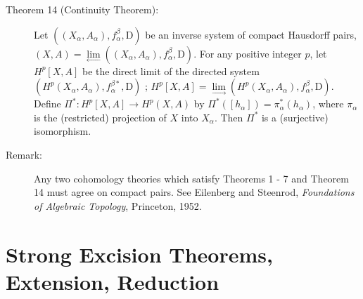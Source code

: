 \documentclass{article}
\def\plim{\lim\limits_{\leftarrow}^{}}
\def\dlim{\lim\limits_{ \rightarrow}^{}}
\begin{document}
\begin{description}
\item[Theorem 14 (Continuity Theorem):] Let $((X_{\alpha}, A_{\alpha}), f_{\alpha}^{\beta}, \text{D})$ be an inverse system of compact Hausdorff pairs, $(X,A) = \plim ((X_{\alpha}, A_{\alpha}), f_{\alpha}^{\beta}, \text{D})$. For any positive integer $p$, let $H^p[X,A]$ be the direct limit of the directed system $(H^p(X_{\alpha}, A_{\alpha}), f_{\alpha}^{\beta*}, \text{D})$ ; $H^p[X,A] = \dlim (H^p(X_{\alpha},A_{\alpha}), f_{\alpha}^{\beta}, \text{D})$. Define $\Pi^*: H^p[X,A] \longrightarrow H^p(X,A)$ by $\Pi^*([h_{\alpha}]) = \pi_{\alpha}^*(h_{\alpha})$, where $\pi_{\alpha}$ is the (restricted) projection of $X$ into $X_{\alpha}$. Then $\Pi^*$ is a (surjective) isomorphism.

\item[Remark:] Any two cohomology theories which satisfy Theorems 1 - 7 and Theorem 14 must agree on compact pairs. See Eilenberg and Steenrod, \emph{Foundations of Algebraic Topology}, Princeton, 1952.

\end{description}



\section{Strong Excision Theorems, Extension, Reduction}
\end{document}
